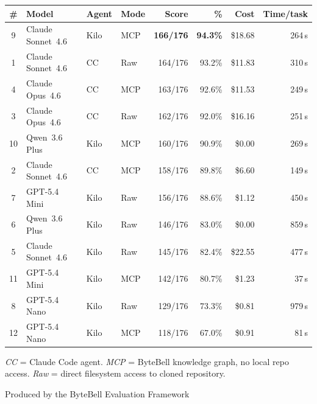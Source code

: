 \documentclass[11pt, a4paper]{article}
\begin{document}
\begin{titlepage}
\begin{table}[h]
\centering
\small
\setlength{\tabcolsep}{4pt}
\begin{tabular}{clllrrrr}
\toprule
\textbf{\#} & \textbf{Model} & \textbf{Agent} & \textbf{Mode} & \textbf{Score} & \textbf{\%} & \textbf{Cost} & \textbf{Time/task} \\
\midrule
\rowcolor{bestcol}
 9 & Claude Sonnet~4.6 & Kilo & MCP & \textbf{166/176} & \textbf{94.3\%} & \$18.68 & 264\,s \\
 1 & Claude Sonnet~4.6 & CC   & Raw & 164/176 & 93.2\% & \$11.83 & 310\,s \\
 4 & Claude Opus~4.6   & CC   & MCP & 163/176 & 92.6\% & \$11.53 & 249\,s \\
 3 & Claude Opus~4.6   & CC   & Raw & 162/176 & 92.0\% & \$16.16 & 251\,s \\
10 & Qwen~3.6 Plus     & Kilo & MCP & 160/176 & 90.9\% & \$0.00  & 269\,s \\
 2 & Claude Sonnet~4.6 & CC   & MCP & 158/176 & 89.8\% & \$6.60  & 149\,s \\
 7 & GPT-5.4 Mini      & Kilo & Raw & 156/176 & 88.6\% & \$1.12  & 450\,s \\
 6 & Qwen~3.6 Plus     & Kilo & Raw & 146/176 & 83.0\% & \$0.00  & 859\,s \\
 5 & Claude Sonnet~4.6 & Kilo & Raw & 145/176 & 82.4\% & \$22.55 & 477\,s \\
11 & GPT-5.4 Mini      & Kilo & MCP & 142/176 & 80.7\% & \$1.23  & 37\,s  \\
 8 & GPT-5.4 Nano      & Kilo & Raw & 129/176 & 73.3\% & \$0.81  & 979\,s \\
12 & GPT-5.4 Nano      & Kilo & MCP & 118/176 & 67.0\% & \$0.91  & 81\,s  \\
\bottomrule
\end{tabular}
\end{table}

{\small
\textit{CC} = Claude Code agent.
\textit{MCP} = ByteBell knowledge graph, no local repo access.
\textit{Raw} = direct filesystem access to cloned repository.
}

\vspace{1.5cm}
{\small Produced by the ByteBell Evaluation Framework}

\end{titlepage}

\tableofcontents
\clearpage

\end{document}
